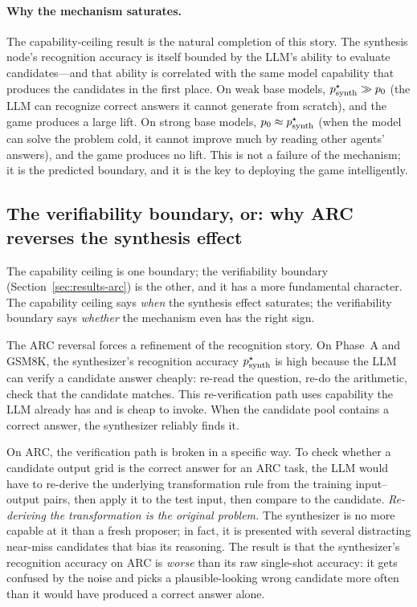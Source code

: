 \documentclass[11pt]{amsart}
\newcommand\1{{\mathds{1}}}
\theoremstyle{definition}
\theoremstyle{remark}
\numberwithin{equation}{section}
\begin{document}
\paragraph{Why the mechanism saturates.}
The capability-ceiling result is the natural completion of this story.
The synthesis node's recognition accuracy is itself bounded by the LLM's ability to evaluate candidates---and that ability is correlated with the same model capability that produces the candidates in the first place.
On weak base models, $p_{\rm synth}^\star \gg p_0$ (the LLM can recognize correct answers it cannot generate from scratch), and the game produces a large lift.
On strong base models, $p_0 \approx p_{\rm synth}^\star$ (when the model can solve the problem cold, it cannot improve much by reading other agents' answers), and the game produces no lift.
This is not a failure of the mechanism; it is the predicted boundary, and it is the key to deploying the game intelligently.

\subsection{The verifiability boundary, or: why ARC reverses the synthesis effect}\label{sec:why-verifiability}

The capability ceiling is one boundary; the verifiability boundary (Section~\ref{sec:results-arc}) is the other, and it has a more fundamental character.
The capability ceiling says \emph{when} the synthesis effect saturates; the verifiability boundary says \emph{whether} the mechanism even has the right sign.

The ARC reversal forces a refinement of the recognition story.
On Phase~A and GSM8K, the synthesizer's recognition accuracy $p_{\rm synth}^\star$ is high because the LLM can verify a candidate answer cheaply: re-read the question, re-do the arithmetic, check that the candidate matches.
This re-verification path uses capability the LLM already has and is cheap to invoke.
When the candidate pool contains a correct answer, the synthesizer reliably finds it.

On ARC, the verification path is broken in a specific way.
To check whether a candidate output grid is the correct answer for an ARC task, the LLM would have to re-derive the underlying transformation rule from the training input--output pairs, then apply it to the test input, then compare to the candidate.
\emph{Re-deriving the transformation is the original problem.}
The synthesizer is no more capable at it than a fresh proposer; in fact, it is presented with several distracting near-miss candidates that bias its reasoning.
The result is that the synthesizer's recognition accuracy on ARC is \emph{worse} than its raw single-shot accuracy: it gets confused by the noise and picks a plausible-looking wrong candidate more often than it would have produced a correct answer alone.
\end{document}
